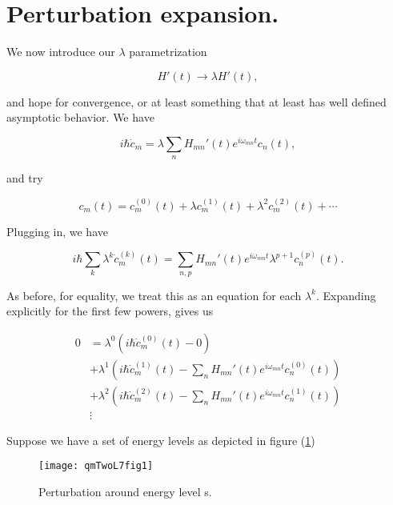 \section{Perturbation expansion.}

We now introduce our $\lambda$ parametrization

\begin{equation}\label{eqn:qmTwoL7:410}
H'(t) \rightarrow \lambda H'(t),
\end{equation}

and hope for convergence, or at least something that at least has well defined asymptotic behavior.  We have

\begin{equation}\label{eqn:qmTwoL7:430}
i \hbar \dot{c}_m = \lambda \sum_n H_{mn}'(t) e^{i \omega_{mn} t} c_n(t),
\end{equation}

and try

\begin{equation}\label{eqn:qmTwoL7:450}
c_m(t) = c_m^{(0)}(t) + \lambda c_m^{(1)}(t) + \lambda^2 c_m^{(2)}(t) + \cdots
\end{equation}

Plugging in, we have

\begin{equation}\label{eqn:qmTwoL7:470}
i \hbar
\sum_k
\lambda^k \dot{c}_m^{(k)}(t)
=
\sum_{n,p} H_{mn}'(t) e^{i \omega_{mn} t}
\lambda^{p+1} c_n^{(p)}(t).
\end{equation}

As before, for equality, we treat this as an equation for each $\lambda^k$.  Expanding explicitly for the first few powers, gives us

\begin{align*}
0
&= \lambda^0 \left( i \hbar \dot{c}_m^{(0)}(t) - 0 \right) \\
&+ \lambda^1 \left( i \hbar \dot{c}_m^{(1)}(t) -
\sum_{n} H_{mn}'(t) e^{i \omega_{mn} t}
c_n^{(0)}(t)
\right) \\
&+ \lambda^2 \left( i \hbar \dot{c}_m^{(2)}(t) -
\sum_{n} H_{mn}'(t) e^{i \omega_{mn} t}
c_n^{(1)}(t)
\right) \\
&\vdots
\end{align*}

Suppose we have a set of energy levels as depicted in figure (\ref{fig:qmTwoL7fig1})

\begin{figure}[htp]
\centering
\texttt{[image: qmTwoL7fig1]}
\caption{Perturbation around energy level s.}\label{fig:qmTwoL7fig1}
\end{figure}

